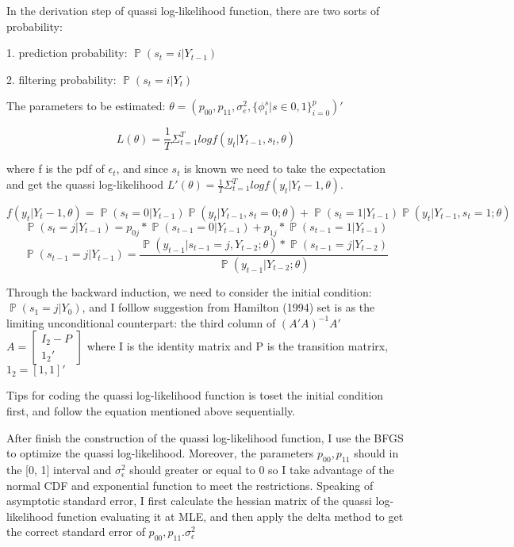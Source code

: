 \documentclass{article}
\DeclareMathOperator{\Prob}{\mathbb{P}}
\begin{document}
In the derivation step of quassi log-likelihood function, there are two sorts of probability:

1. prediction probability: $\Prob(s_t = i | Y_{t-1})$

2. filtering probability: $\Prob(s_t = i | Y_{t})$

The parameters to be estimated: $\theta = ( p_{00}, p_{11}, \sigma_e^2, \{ \phi_i^s | s \in {0, 1} \}_{i=0}^p )'$

$$
L(\theta) = \frac{1}{T} \Sigma_{t=1}^T log f(y_t | Y_{t-1}, s_t, \theta)
$$

where f is the pdf of $\epsilon_t$, and since $s_t$ is known we need to take the expectation
and get the quassi log-likelihood $L'(\theta) = \frac{1}{T} \Sigma_{t=1}^T log f(y_t | Y{_t-1}, \theta)$.

$$  
f(y_t | Y{_t-1}, \theta) = 
    \Prob(s_t=0|Y_{t-1})\Prob(y_t|Y_{t-1}, s_{t}=0; \theta) +
    \Prob(s_t=1|Y_{t-1})\Prob(y_t|Y_{t-1}, s_{t}=1; \theta)
$$
$$
\Prob(s_t = j | Y_{t-1}) = p_{0j} * \Prob(s_{t-1}=0|Y_{t-1}) +
                           p_{1j} * \Prob(s_{t-1}=1|Y_{t-1})
$$
$$
\Prob(s_{t-1}=j|Y_{t-1}) = \frac{\Prob(y_{t-1}|s_{t-1}=j, Y_{t-2}; \theta) * 
                                 \Prob(s_{t-1} = j | Y_{t-2})}{\Prob(y_{t-1}|Y_{t-2}; \theta)}
$$

Through the backward induction, we need to consider the initial condition: $\Prob(s_1 = j | Y_0)$,
and I folllow suggestion from Hamilton (1994) set is as the limiting unconditional
counterpart: the third column of $(A'A)^{-1}A'$
$
A = 
\begin{bmatrix}
  I_{2} - P \\ 1_2' 
\end{bmatrix}
$
where I is the identity matrix and P is the transition matrirx, $1_2 = [1, 1]'$

Tips for coding the quassi log-likelihood function is toset the 
initial condition first, and follow the equation mentioned above sequentially.

After finish the construction of the quassi log-likelihood function, I use the BFGS to optimize the quassi
log-likelihood. Moreover, the parameters $p_{00}, p_{11}$ should in the [0, 1] interval
and $\sigma_{\epsilon}^2$ should greater or equal to 0 so I take advantage of the normal
CDF and exponential function to meet the restrictions. Speaking of asymptotic standard error, 
I first calculate the hessian matrix of the quassi log-likelihood function
evaluating it at MLE, and then apply the delta method to get the correct standard error
of $p_{00}, p_{11}. \sigma_{\epsilon}^2$
\end{document}
